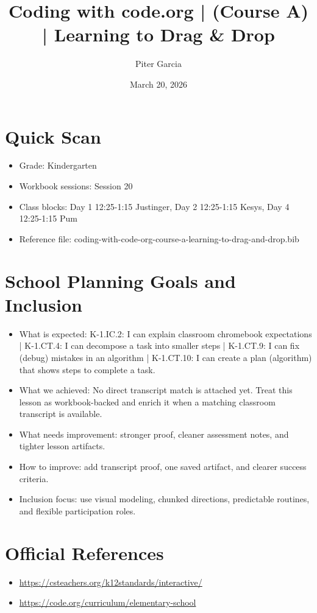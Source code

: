 \documentclass[11pt]{article}
\title{Coding with code.org | (Course A) | Learning to Drag & Drop}
\author{Piter Garcia}
\date{March 20, 2026}
\begin{document}
    \maketitle
    \section*{Quick Scan}
    \begin{itemize}[leftmargin=*]
    \item Grade: Kindergarten
    \item Workbook sessions: Session 20
    \item Class blocks: Day 1 12:25-1:15 Justinger, Day 2 12:25-1:15 Kesys, Day 4 12:25-1:15 Pum
    \item Reference file: coding-with-code-org-course-a-learning-to-drag-and-drop.bib
    \end{itemize}
    \section*{School Planning Goals and Inclusion}
    \begin{itemize}[leftmargin=*]
    \item What is expected: K-1.IC.2: I can explain classroom chromebook expectations | K-1.CT.4: I can decompose a task into smaller steps | K-1.CT.9: I can fix (debug) mistakes in an algorithm | K-1.CT.10: I can create a plan (algorithm) that shows steps to complete a task.
    \item What we achieved: No direct transcript match is attached yet. Treat this lesson as workbook-backed and enrich it when a matching classroom transcript is available.
    \item What needs improvement: stronger proof, cleaner assessment notes, and tighter lesson artifacts.
    \item How to improve: add transcript proof, one saved artifact, and clearer success criteria.
    \item Inclusion focus: use visual modeling, chunked directions, predictable routines, and flexible participation roles.
    \end{itemize}
    \section*{Official References}
    \begin{itemize}[leftmargin=*]
    \item \url{https://csteachers.org/k12standards/interactive/}
\item \url{https://code.org/curriculum/elementary-school}

    \end{itemize}
    
\end{document}
